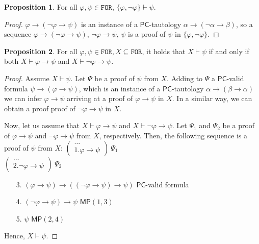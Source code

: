 \documentclass{article}
\theoremstyle{definition}
\theoremstyle{definition}
\theoremstyle{definition}
\theoremstyle{definition}
\theoremstyle{definition}
\newtheorem{proposition}{Proposition}[section]
\newcommand*{\ra}{\rightarrow}
\newcommand*{\FOR}{\texttt{FOR}}
\newcommand{\PC}{$\mathsf{PC}$\xspace}
\newcommand{\MP}{\mathsf{MP}}
\begin{document}
\begin{proposition} For all $\varphi, \psi \in \FOR$, $\{\varphi, \lnot \varphi\} \vdash \psi$.
    \label{falsehood_proves_all}
    \begin{proof} $\varphi \ra (\lnot \varphi \ra \psi)$ is an instance of a \PC-tautology $\alpha \ra (\lnot \alpha \ra \beta)$, so a sequence $\varphi \ra (\lnot \varphi \ra \psi)$, $\lnot \varphi \ra \psi$, $\psi$ is a proof of $\psi$ in $\{\varphi, \lnot \varphi\}$.
    \end{proof}
\end{proposition}

\begin{proposition}
    \label{phi_not_phi_ra_psi}
    For all $\varphi, \psi \in \FOR, X \subseteq \FOR$, it holds that $X \vdash \psi$ if and only if both $X \vdash \varphi \ra \psi$ and $X \vdash \lnot \varphi \ra \psi$.

    \begin{proof}
        Assume $X \vdash \psi$. Let $\Psi$ be a proof of $\psi$ from $X$. Adding to $\Psi$ a \PC-valid formula $\psi \ra (\varphi \ra \psi)$, which is an instance of a \PC-tautology $\alpha \ra (\beta \ra \alpha)$ we can infer $\varphi \ra \psi$ arriving at a proof of $\varphi \ra \psi$ in $X$. In a similar way, we can obtain a proof proof of $\lnot \varphi \ra \psi$ in $X$.

        Now, let us assume that $X \vdash \varphi \ra \psi$ and $X \vdash \lnot \varphi
            \ra \psi$. Let $\Psi_1$ and $\Psi_2$ be a proof of $\varphi \ra \psi$ and $\lnot \varphi \ra \psi$ from $X$, respectively. Then, the following sequence is a proof of $\psi$ from $X$:
            $
            \left( \begin{array}{l} 
                \ldots \\
                1. \varphi \rightarrow \psi
            \end{array} 
            \right)\ \Psi_1
            $
\\
            $
            \left( \begin{array}{l} 
                \ldots \\
                2. \lnot \varphi \rightarrow \psi
            \end{array} 
            \right)\ \Psi_2
            $
%
            \begin{enumerate}
            \item[3.] $(\varphi \ra \psi) \ra ((\lnot \varphi \ra \psi) \ra \psi)$ \hfill \PC-valid formula
            \item[4.] $(\lnot \varphi \ra \psi) \ra \psi$ \hfill $\MP(1,3)$
            \item[5.] $\psi$ \hfill $\MP(2,4)$
            \end{enumerate}
            Hence, $X \vdash \psi$.
            

\end{proof}
\end{proposition}
\end{document}
